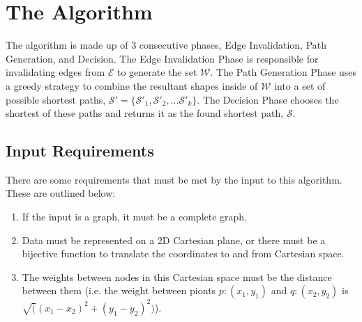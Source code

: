 \documentclass[12pt]{article}
\begin{document}
\section{The Algorithm}
The algorithm is made up of 3 consecutive phases,
Edge Invalidation, Path Generation, and Decision.
The Edge Invalidation Phase is
responsible for invalidating edges from $\mathcal{E}$ to generate the set
$\mathcal{W}$. The Path Generation Phase uses a greedy strategy to combine the resultant
shapes inside of $\mathcal{W}$ into a set of possible shortest paths,
$\mathcal{S}' = \{\mathcal{S}'_1, \mathcal{S}'_2, ... \mathcal{S}'_k\}$.
The Decision Phase chooses the shortest of these paths and returns it as the
found shortest path, $\mathcal{S}$.

\subsection{Input Requirements}\label{subsec:req}
There are some requirements that must be met by the input to this algorithm.
These are outlined below:
\begin{enumerate}
\item If the input is a graph, it must be a complete graph.
\item Data must be represented on a 2D Cartesian plane,
or there must be a bijective function to translate the coordinates to and from
Cartesian space.
\item The weights between nodes in this Cartesian space must be the distance between them
(i.e. the weight between pionts $p:(x_1, y_1)$ and $q:(x_2, y_2)$ is
$\sqrt((x_1 - x_2)^2 + (y_1 - y_2)^2)$).
\end{enumerate}
\end{document}
